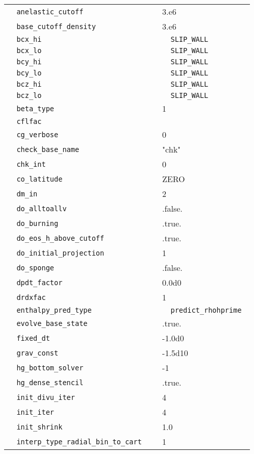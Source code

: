 \begin{center}
\begin{longtable}{|l|p{3.0in}|l|}
\hline 
\endlastfoot
\verb=  anelastic_cutoff =  &   &  3.e6  \\
\verb=  base_cutoff_density =  &   &  3.e6 \\
\verb=  bcx_hi =  &   & \verb=  SLIP_WALL = \\
\verb=  bcx_lo =  &   & \verb=  SLIP_WALL = \\
\verb=  bcy_hi =  &   & \verb=  SLIP_WALL = \\
\verb=  bcy_lo =  &   & \verb=  SLIP_WALL = \\
\verb=  bcz_hi =  &   & \verb=  SLIP_WALL = \\
\verb=  bcz_lo =  &   & \verb=  SLIP_WALL = \\
\verb=  beta_type =  &   &  1  \\
\verb=  cflfac =  &   &   \\
\verb=  cg_verbose =  &   &  0  \\
\verb=  check_base_name =  &   & "chk" \\
\verb=  chk_int =  &   &  0  \\
\verb=  co_latitude =  &   &  ZERO  \\
\verb=  dm_in =  &   & 2 \\
\verb=  do_alltoallv =  &   &  .false.  \\
\verb=  do_burning =  &   &  .true.  \\
\verb=  do_eos_h_above_cutoff =  &   &  .true.  \\
\verb=  do_initial_projection =  &   &  1  \\
\verb=  do_sponge =  &   &  .false.  \\
\verb=  dpdt_factor =  &   &  0.0d0  \\
\verb=  drdxfac =  &   &  1  \\
\verb=  enthalpy_pred_type =  &   & \verb=  predict_rhohprime = \\
\verb=  evolve_base_state =  &   &  .true.  \\
\verb=  fixed_dt =  &   &  -1.0d0  \\
\verb=  grav_const =  &   &  -1.5d10  \\
\verb=  hg_bottom_solver =  &   &  -1  \\
\verb=  hg_dense_stencil =  &   &  .true.  \\
\verb=  init_divu_iter =  &   &  4  \\
\verb=  init_iter =  &   &  4  \\
\verb=  init_shrink =  &   &  1.0  \\
\verb=  interp_type_radial_bin_to_cart =  &   &  1  \\

\end{longtable}
\end{center}
